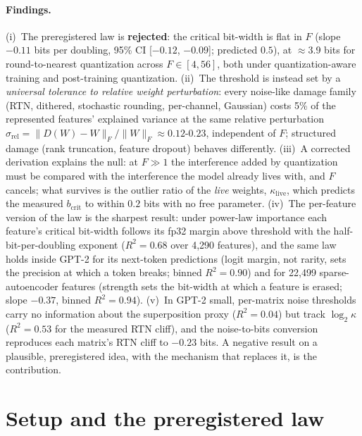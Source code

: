 \documentclass{article}
\begin{document}
\paragraph{Findings.} (i)~The preregistered law is \textbf{rejected}: the critical bit-width is flat in
$F$ (slope $-0.11$ bits per doubling, 95\% CI [$-0.12$, $-0.09$]; predicted $0.5$), at $\approx$3.9 bits for round-to-nearest
quantization across $F\in[4,56]$, both under quantization-aware training and post-training quantization.
(ii)~The threshold is instead set by a \emph{universal tolerance to relative weight perturbation}: every noise-like
damage family (RTN, dithered, stochastic rounding, per-channel, Gaussian) costs 5\% of the represented features'
explained variance at the same relative perturbation $\sigma_{\mathrm{rel}} = \lVert D(W)-W\rVert_F/\lVert W\rVert_F
\approx 0.12$-$0.23$, independent of $F$; structured damage (rank truncation, feature dropout) behaves differently.
(iii)~A corrected derivation explains the null: at $F\gg1$ the interference added by quantization must be compared
with the interference the model already lives with, and $F$ cancels; what survives is the outlier ratio of the
\emph{live} weights, $\kappa_{\mathrm{live}}$, which predicts the measured $b_{\mathrm{crit}}$ to within
$0.2$ bits with no free parameter. (iv)~The per-feature version of the law is the sharpest result: under power-law importance each feature's critical
bit-width follows its fp32 margin above threshold with the half-bit-per-doubling exponent ($R^2=0.68$ over 4{,}290
features), and the same law holds inside GPT-2 for its next-token predictions (logit margin, not rarity, sets the precision at
which a token breaks; binned $R^2=0.90$) and for 22{,}499 sparse-autoencoder features (strength sets the bit-width at
which a feature is erased; slope $-0.37$, binned $R^2=0.94$). (v)~In GPT-2 small, per-matrix noise thresholds carry no information about the superposition proxy ($R^2=0.04$) but track $\log_2\kappa$ ($R^2 = 0.53$ for the measured RTN cliff), and the noise-to-bits conversion reproduces each matrix's RTN cliff to $-0.23$ bits.
A negative result on a plausible, preregistered idea, with the mechanism that replaces it, is the contribution.


\section{Setup and the preregistered law}
\end{document}
